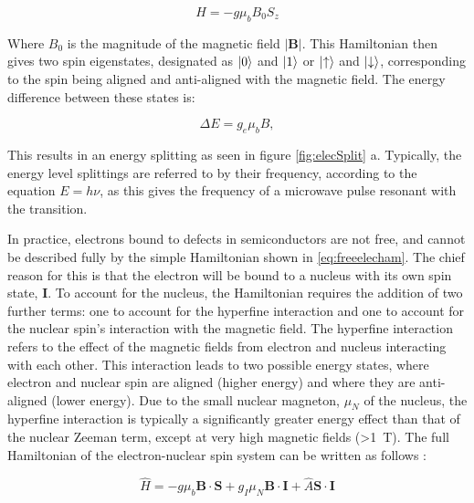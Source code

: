 \begin{equation}
H = -g\mu_bB_0S_z
\label{eq:freeelecham}
\end{equation}

Where $B_0$ is the magnitude of the magnetic field $|\mathbf{B}|$. This Hamiltonian then gives two spin eigenstates, designated as $\ket{0}$ and $\ket{1}$ or $\ket{\uparrow}$ and $\ket{\downarrow}$, corresponding to the spin being aligned and anti-aligned with the magnetic field. The energy difference between these states is:

\begin{equation}
\Delta E = g_e\mu_bB,
\label{eq:enSplit}
\end{equation}

This results in an energy splitting as seen in figure \ref{fig:elecSplit} a. Typically, the energy level splittings are referred to by their frequency, according to the equation $E = h\nu$, as this gives the frequency of a microwave pulse resonant with the transition.

In practice, electrons bound to defects in semiconductors are not free, and cannot be described fully by the simple Hamiltonian shown in \ref{eq:freeelecham}. The chief reason for this is that the electron will be bound to a nucleus with its own spin state, $\mathbf{I}$. To account for the nucleus, the Hamiltonian requires the addition of two further terms: one to account for the hyperfine interaction and one to account for the nuclear spin's interaction with the magnetic field. The hyperfine interaction refers to the effect of the magnetic fields from electron and nucleus interacting with each other. This interaction leads to two possible energy states, where electron and nuclear spin are aligned (higher energy) and where they are anti-aligned (lower energy). Due to the small nuclear magneton, $\mu_N$ of the nucleus, the hyperfine interaction is typically a significantly greater energy effect than that of the nuclear Zeeman term, except at very high magnetic fields (>1~T). The full Hamiltonian of the electron-nuclear spin system can be written as follows \cite{landlifquantmech}:

\begin{equation}
  \hat{H} = -g\mu_b\mathbf{B}\cdot\mathbf{S} + g_I\mu_N\mathbf{B}\cdot\mathbf{I} + \hat{A}\mathbf{S}\cdot\mathbf{I}
  \label{eqn:phos-ham}
\end{equation}

